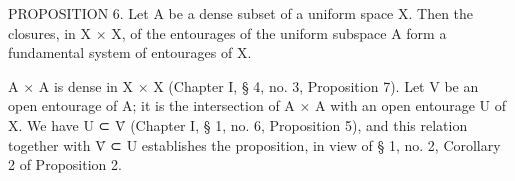 PROPOSITION 6. Let A be a dense subset of a uniform space X. Then the closures, in X × X, of the entourages of the uniform subspace A form a fundamental system of entourages of X.

A × A is dense in X × X (Chapter I, § 4, no. 3, Proposition 7). Let V be an open entourage of A; it is the intersection of A × A with an open entourage U of X. We have U ⊂ V̄ (Chapter I, § 1, no. 6, Proposition 5), and this relation together with V̄ ⊂ U establishes the proposition, in view of § 1, no. 2, Corollary 2 of Proposition 2.

